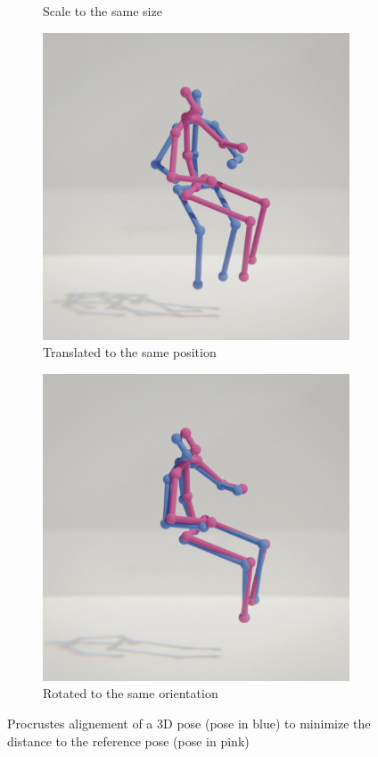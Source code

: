 \begin{figure}
\begin{subfigure}[b]{0.25\textwidth}
        \caption{Scale to the same size}
    \end{subfigure}
    \hfill
    \begin{subfigure}[b]{0.25\textwidth}
        \centering
        \includegraphics[width=\textwidth]{figures/h36_viz/proc_pos.png}
        \caption{Translated to the same position}
    \end{subfigure}
    \hfill
    \begin{subfigure}[b]{0.25\textwidth}
        \centering
        \includegraphics[width=\textwidth]{figures/h36_viz/proc_rot.png}
        \caption{Rotated to the same orientation}
    \end{subfigure}
    \caption{Procrustes alignement of a 3D pose (pose in blue) to minimize the distance to the reference pose (pose in pink)}
    \label{fig:procrustes}
\end{figure}
